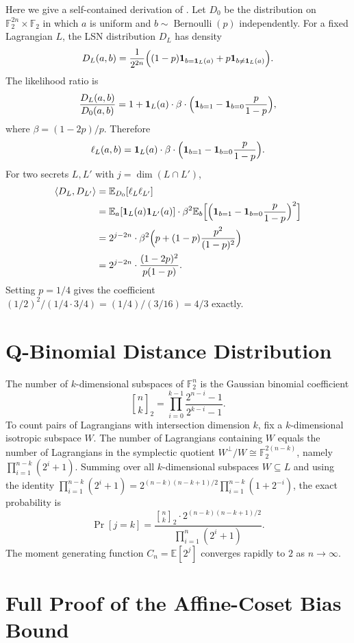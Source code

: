 \documentclass[11pt,a4paper]{article}
\theoremstyle{plain}
\theoremstyle{definition}
\newcommand{\F}{\mathbb{F}}
\newcommand{\E}{\mathbb{E}}
\begin{document}
Here we give a self-contained derivation of . Let $D_0$ be the distribution on $\F_2^{2n} \times \F_2$ in which $a$ is uniform and $b \sim \operatorname{Bernoulli}(p)$ independently. For a fixed Lagrangian $L$, the LSN distribution $D_L$ has density
\[
D_L(a,b) = \frac{1}{2^{2n}} \Bigl( (1-p)\mathbf{1}_{b=\mathbf{1}_L(a)} + p\mathbf{1}_{b \neq \mathbf{1}_L(a)} \Bigr).
\]
The likelihood ratio is
\[
\frac{D_L(a,b)}{D_0(a,b)} = 1 + \mathbf{1}_L(a) \cdot \beta \cdot \Bigl(\mathbf{1}_{b=1} - \mathbf{1}_{b=0}\frac{p}{1-p}\Bigr),
\]
where $\beta = (1-2p)/p$. Therefore
\[
\ell_L(a,b) = \mathbf{1}_L(a) \cdot \beta \cdot \Bigl(\mathbf{1}_{b=1} - \mathbf{1}_{b=0}\frac{p}{1-p}\Bigr).
\]
For two secrets $L,L'$ with $j = \dim(L \cap L')$,
\begin{align*}
\langle D_L, D_{L'} \rangle
&= \E_{D_0}[\ell_L \ell_{L'}] \\
&= \E_a[\mathbf{1}_L(a)\mathbf{1}_{L'}(a)] \cdot
   \beta^2 \E_b\Bigl[\Bigl(\mathbf{1}_{b=1} - \mathbf{1}_{b=0}\frac{p}{1-p}\Bigr)^2\Bigr] \\
&= 2^{j-2n} \cdot \beta^2 \Bigl( p + (1-p)\frac{p^2}{(1-p)^2} \Bigr) \\
&= 2^{j-2n} \cdot \frac{(1-2p)^2}{p(1-p)}.
\end{align*}
Setting $p=1/4$ gives the coefficient $(1/2)^2 / (1/4 \cdot 3/4) = (1/4)/(3/16) = 4/3$ exactly.

\section{Q-Binomial Distance Distribution}
\label{app:qbin}

The number of $k$-dimensional subspaces of $\F_2^n$ is the Gaussian binomial coefficient
\[
{n \brack k}_2 = \prod_{i=0}^{k-1} \frac{2^{n-i}-1}{2^{k-i}-1}.
\]
To count pairs of Lagrangians with intersection dimension $k$, fix a $k$-dimensional isotropic subspace $W$. The number of Lagrangians containing $W$ equals the number of Lagrangians in the symplectic quotient $W^\perp / W \cong \F_2^{2(n-k)}$, namely $\prod_{i=1}^{n-k}(2^i+1)$. Summing over all $k$-dimensional subspaces $W \subseteq L$ and using the identity $\prod_{i=1}^{n-k}(2^i+1) = 2^{(n-k)(n-k+1)/2} \prod_{i=1}^{n-k}(1+2^{-i})$, the exact probability is
\[
\Pr[j=k] = \frac{{n \brack k}_2 \cdot 2^{(n-k)(n-k+1)/2}}{\prod_{i=1}^n (2^i+1)}.
\]
The moment generating function $C_n = \E[2^j]$ converges rapidly to $2$ as $n \to \infty$.

\section{Full Proof of the Affine-Coset Bias Bound}
\label{app:krawtchouk}
\end{document}

